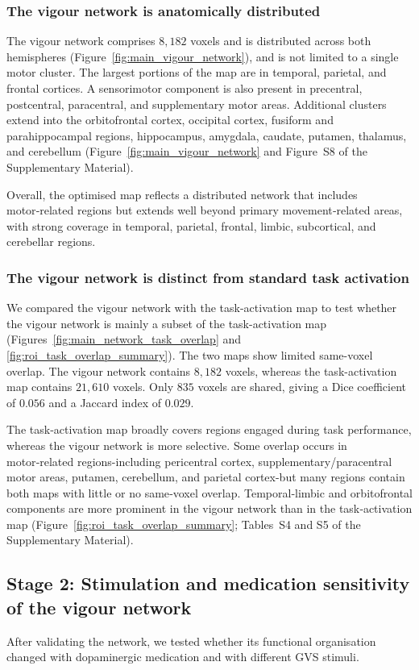 \documentclass[utf8]{FrontiersinHarvard}
\begin{document}
\subsubsection{The vigour network is anatomically distributed}
The vigour network comprises \(8{,}182\) voxels and is distributed across both hemispheres (Figure~\ref{fig:main_vigour_network}), and is not limited to a single motor cluster. The largest portions of the map are in temporal, parietal, and frontal cortices. A sensorimotor component is also present in precentral, postcentral, paracentral, and supplementary motor areas. Additional clusters extend into the orbitofrontal cortex, occipital cortex, fusiform and parahippocampal regions, hippocampus, amygdala, caudate, putamen, thalamus, and cerebellum (Figure~\ref{fig:main_vigour_network} and Figure~S8 of the Supplementary Material).

Overall, the optimised map reflects a distributed network that includes motor‑related regions but extends well beyond primary movement‑related areas, with strong coverage in temporal, parietal, frontal, limbic, subcortical, and cerebellar regions.

\subsubsection{The vigour network is distinct from standard task activation}
We compared the vigour network with the task-activation map to test whether the vigour network is mainly a subset of the task-activation map (Figures~\ref{fig:main_network_task_overlap} and \ref{fig:roi_task_overlap_summary}). The two maps show limited same-voxel overlap. The vigour network contains \(8{,}182\) voxels, whereas the task-activation map contains \(21{,}610\) voxels. Only \(835\) voxels are shared, giving a Dice coefficient of \(0.056\) and a Jaccard index of \(0.029\).

The task‑activation map broadly covers regions engaged during task performance, whereas the vigour network is more selective. Some overlap occurs in motor‑related regions-including pericentral cortex, supplementary/paracentral motor areas, putamen, cerebellum, and parietal cortex-but many regions contain both maps with little or no same‑voxel overlap. Temporal‑limbic and orbitofrontal components are more prominent in the vigour network than in the task‑activation map (Figure~\ref{fig:roi_task_overlap_summary}; Tables~S4 and S5 of the Supplementary Material).

\subsection{Stage 2: Stimulation and medication sensitivity of the vigour network}
After validating the network, we tested whether its functional organisation changed with dopaminergic medication and with different GVS stimuli.
\end{document}
